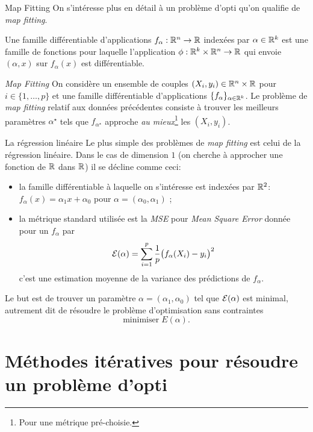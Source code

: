 \documentclass[aspectratio = 169]{beamer}
\begin{document}
\begin{frame}{Map Fitting}
  On s'intéresse plus en détail à un problème d'opti qu'on qualifie
  de \textit{map fitting}.
  \begin{defn}
    Une famille différentiable d'applications
    $f_{\alpha} : \mathbb{R}^n \to \mathbb{R}$ indexées par $\alpha \in \mathbb{R}^k$ est une
    famille de fonctions pour laquelle l'application
    $\phi : \mathbb{R}^k \times \mathbb{R}^n \to \mathbb{R}$ qui envoie $(\alpha, x)$ sur
    $f_{\alpha}(x)$ est différentiable.
  \end{defn}
  \begin{halfshyblock}{\textit{Map Fitting}}
    On considère un ensemble de couples $(X_i, y_i) \in \mathbb{R}^n\times \mathbb{R}$
    pour $i \in \{1, \ldots, p\}$ et une famille différentiable
    d'applications $\{f_\alpha\}_{\alpha \in \mathbb{R}^k}$. Le problème de
    \textit{map fitting} relatif aux données précédentes consiste à
    trouver les meilleurs paramètres $\alpha^\star$ tels que
    $f_{\alpha^\star}$ approche \textit{au mieux}\footnote{Pour une
      métrique pré-choisie.} les $(X_i, y_i)$.
  \end{halfshyblock}
\end{frame}

\begin{frame}{La régression linéaire}
  Le plus simple des problèmes de \textit{map fitting} est celui de la
  régression linéaire. Dans le cas de dimension $1$ (on cherche à
  approcher une fonction de $\mathbb{R}$ dans $\mathbb{R}$) il se décline comme ceci:
  \begin{itemize}
  \item<2-> la famille différentiable à laquelle on s'intéresse est
    indexées par $\mathbb{R}^2$: $f_\alpha(x) = \alpha_1 x + \alpha_0$ pour
    $\alpha = (\alpha_0, \alpha_1)$ ;
  \item<3-> la métrique standard utilisée est la \emph{MSE} pour
    \emph{Mean Square Error} donnée pour un $f_\alpha$ par
    \[
      \mathcal{E}(\alpha) = \sum_{i=1}^p \frac{1}{p}\big(f_\alpha(X_i) - y_i\big)^2
    \]
    c'est une estimation moyenne de la variance des prédictions de
    $f_\alpha$.
  \end{itemize}
  \pause[4] Le but est de trouver un paramètre
  $\alpha = (\alpha_1, \alpha_0)$ tel que $\mathcal{E}(\alpha)$ est
  minimal, autrement dit de résoudre le problème d'optimisation sans
  contraintes
  \[
    \mathrm{minimiser }\; E(\alpha).
  \]
\end{frame}

\section{Méthodes itératives pour résoudre un problème d'opti}
\end{document}
